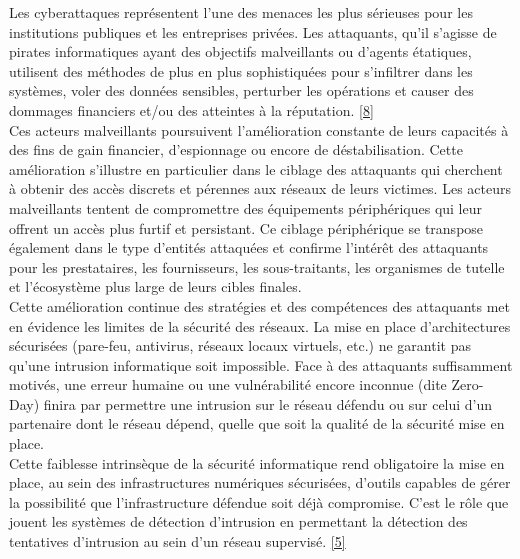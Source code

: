 \vspace{0.75em}

Les cyberattaques représentent l'une des menaces les plus sérieuses pour les institutions publiques et les entreprises privées. Les attaquants, qu'il s'agisse de pirates informatiques ayant des objectifs malveillants ou d'agents étatiques, utilisent des méthodes de plus en plus sophistiquées pour s'infiltrer dans les systèmes, voler des données sensibles, perturber les opérations et causer des dommages financiers et/ou des atteintes à la réputation. \hyperref[biblio]{[8]}\\

Ces acteurs malveillants poursuivent l’amélioration constante de leurs capacités à des fins de gain financier, d’espionnage ou encore de déstabilisation. Cette amélioration s’illustre en particulier dans le ciblage des  attaquants qui cherchent à obtenir des accès discrets et pérennes aux réseaux de leurs victimes. Les acteurs malveillants tentent de compromettre des équipements périphériques qui  leur offrent un accès plus furtif et persistant. Ce ciblage périphérique se transpose également dans le type d’entités attaquées et confirme l’intérêt des attaquants pour les prestataires, les fournisseurs, les sous-traitants, les organismes de tutelle et l’écosystème plus large de leurs cibles finales.\\

Cette amélioration continue des stratégies et des compétences des attaquants met en évidence les limites de la sécurité des réseaux. La mise en place d'architectures sécurisées (pare-feu, antivirus, réseaux locaux virtuels, etc.) ne garantit pas qu'une intrusion informatique soit impossible. Face à des attaquants suffisamment motivés, une erreur humaine ou une vulnérabilité encore inconnue (dite Zero-Day) finira par permettre une intrusion sur le réseau défendu ou sur celui d'un partenaire dont le réseau dépend, quelle que soit la qualité de la sécurité mise en place.\\

Cette faiblesse intrinsèque de la sécurité informatique rend obligatoire la mise en place, au sein des infrastructures numériques sécurisées, d'outils capables de gérer la possibilité que l'infrastructure défendue soit déjà compromise. C'est le rôle que jouent les systèmes de détection d'intrusion en permettant la détection des tentatives d'intrusion au sein d'un réseau supervisé. \hyperref[biblio]{[5]}